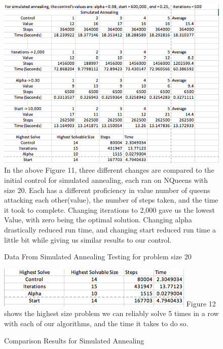 \documentclass{article}
\begin{document}
\begin{figure}[!htb]
\caption{Data From Simulated Annealing Testing for problem size 20}
\includegraphics[width=\textwidth]{SimData.png}
In the above Figure 11, three different changes are compared to the initial control for simulated annealing, each ran on NQueens with size 20. Each has a different proficiency in value number of queens attacking each other(value), the number of steps taken, and the time it took to complete. Changing iterations to 2,000 gave us the lowest Value, with zero being the optimal solution. Changing alpha drastically reduced run time, and changing start reduced run time a little bit while giving us similar results to our control.
\end{figure}

\begin{figure}[!htb]
\caption{Comparison Results for Simulated Annealing}
\includegraphics[width=\textwidth]{SimComp.png}
Figure 12 shows the highest size problem we can reliably solve 5 times in a row with each of our algorithms, and the time it takes to do so.
\end{figure}
\end{document}
